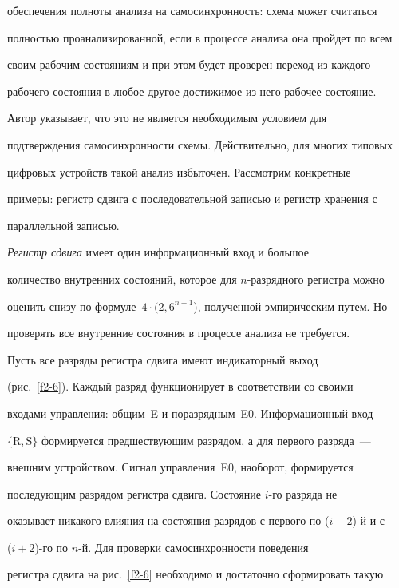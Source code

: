 обеспечения полноты анализа на самосинхронность: схема может считаться 


полностью проанализированной, если в процессе анализа она пройдет по всем 


своим рабочим состояниям и при этом будет проверен переход из каждого 


рабочего состояния в любое другое достижимое из него рабочее состояние. 


Автор указывает, что это не является необходимым условием для 


подтверждения самосинхронности схемы. Действительно, для многих типовых 


цифровых устройств такой анализ избыточен. Рассмотрим конкретные 


примеры: регистр сдвига с последовательной записью и регистр хранения с 


параллельной записью.


      


      \textit{Регистр сдвига} имеет один информационный вход и большое 


количество внутренних состояний, которое для $n$-разрядного регистра можно 


оценить снизу по формуле~$4\cdot (2{,}6^{n-1}$), полученной эмпирическим путем. Но 


проверять все внутренние состояния в процессе анализа не требуется. 


      


      Пусть все разряды регистра сдвига имеют индикаторный выход 


(рис.~\ref{f2-6}). Каждый разряд функционирует в соответствии со своими 


входами управления: общим~E и поразрядным~E0. Информационный вход 


$\{\mathrm{R}, \mathrm{S}\}$ формируется предшествующим разрядом, а для первого разряда~--- 


внешним устройством. Сигнал управления~E0, наоборот, формируется 


последующим разрядом регистра сдвига. Состояние $i$-го разряда не 


оказывает никакого влияния на состояния разрядов с первого по ($i - 2$)-й и с 


      ($i + 2$)-го по $n$-й. Для проверки самосинхронности поведения 


регистра сдвига на рис.~\ref{f2-6} необходимо и достаточно сформировать такую 


